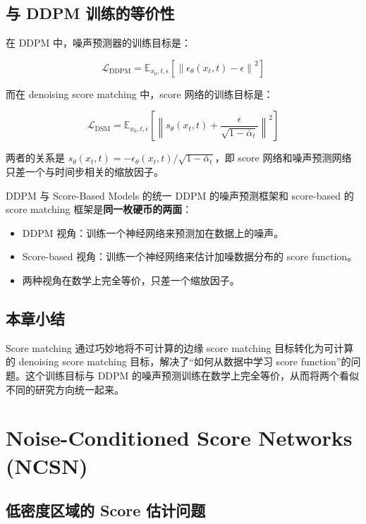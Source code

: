 \documentclass[a4paper]{article}
\begin{document}
\subsection{与 DDPM 训练的等价性}

在 DDPM 中，噪声预测器的训练目标是：

$$\mathcal{L}_{\text{DDPM}} = \mathbb{E}_{x_0, t, \epsilon}\left[\left\| \epsilon_\theta(x_t, t) - \epsilon \right\|^2\right]$$

而在 denoising score matching 中，score 网络的训练目标是：

$$\mathcal{L}_{\text{DSM}} = \mathbb{E}_{x_0, t, \epsilon}\left[\left\| s_\theta(x_t, t) + \frac{\epsilon}{\sqrt{1-\bar{\alpha}_t}} \right\|^2\right]$$

两者的关系是 $s_\theta(x_t, t) = -\epsilon_\theta(x_t, t) / \sqrt{1-\bar{\alpha}_t}$，即 score 网络和噪声预测网络只差一个与时间步相关的缩放因子。

\begin{importantbox}{DDPM 与 Score-Based Models 的统一}
DDPM 的噪声预测框架和 score-based 的 score matching 框架是\textbf{同一枚硬币的两面}：
\begin{itemize}
    \item DDPM 视角：训练一个神经网络来预测加在数据上的噪声。
    \item Score-based 视角：训练一个神经网络来估计加噪数据分布的 score function。
    \item 两种视角在数学上完全等价，只差一个缩放因子。
\end{itemize}
\end{importantbox}

\subsection{本章小结}

Score matching 通过巧妙地将不可计算的边缘 score matching 目标转化为可计算的 denoising score matching 目标，解决了``如何从数据中学习 score function''的问题。这个训练目标与 DDPM 的噪声预测训练在数学上完全等价，从而将两个看似不同的研究方向统一起来。

\section{Noise-Conditioned Score Networks (NCSN)}

\subsection{低密度区域的 Score 估计问题}
\end{document}
